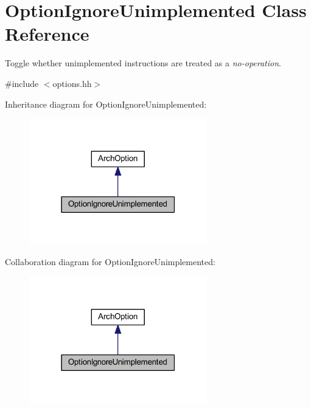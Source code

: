 \hypertarget{class_option_ignore_unimplemented}{}\section{Option\+Ignore\+Unimplemented Class Reference}
\label{class_option_ignore_unimplemented}


Toggle whether unimplemented instructions are treated as a {\itshape no-\/operation}.  




{\ttfamily \#include $<$options.\+hh$>$}



Inheritance diagram for Option\+Ignore\+Unimplemented\+:
\nopagebreak
\begin{figure}[H]
\begin{center}
\leavevmode
\includegraphics[width=219pt]{class_option_ignore_unimplemented__inherit__graph}
\end{center}
\end{figure}


Collaboration diagram for Option\+Ignore\+Unimplemented\+:
\nopagebreak
\begin{figure}[H]
\begin{center}
\leavevmode
\includegraphics[width=219pt]{class_option_ignore_unimplemented__coll__graph}
\end{center}
\end{figure}
